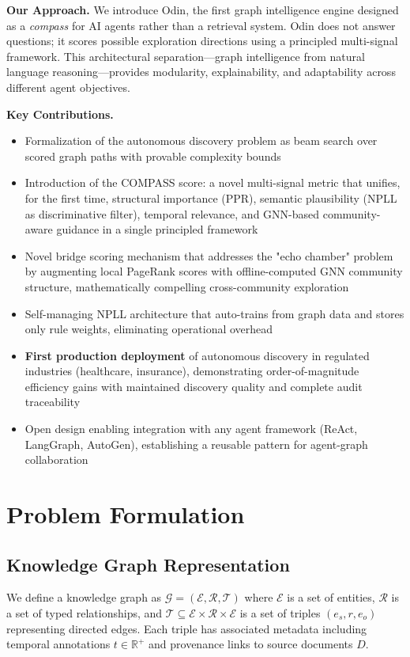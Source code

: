 \documentclass[10pt,twocolumn]{article}
\begin{document}
\textbf{Our Approach.} We introduce Odin, the first graph intelligence engine designed as a \textit{compass} for AI agents rather than a retrieval system. Odin does not answer questions; it scores possible exploration directions using a principled multi-signal framework. This architectural separation---graph intelligence from natural language reasoning---provides modularity, explainability, and adaptability across different agent objectives.

\textbf{Key Contributions.}
\begin{itemize}
\item Formalization of the autonomous discovery problem as beam search over scored graph paths with provable complexity bounds
\item Introduction of the COMPASS score: a novel multi-signal metric that unifies, for the first time, structural importance (PPR), semantic plausibility (NPLL as discriminative filter), temporal relevance, and GNN-based community-aware guidance in a single principled framework
\item Novel bridge scoring mechanism that addresses the "echo chamber" problem by augmenting local PageRank scores with offline-computed GNN community structure, mathematically compelling cross-community exploration
\item Self-managing NPLL architecture that auto-trains from graph data and stores only rule weights, eliminating operational overhead
\item \textbf{First production deployment} of autonomous discovery in regulated industries (healthcare, insurance), demonstrating order-of-magnitude efficiency gains with maintained discovery quality and complete audit traceability
\item Open design enabling integration with any agent framework (ReAct, LangGraph, AutoGen), establishing a reusable pattern for agent-graph collaboration
\end{itemize}

\section{Problem Formulation}
\label{sec:problem}

\subsection{Knowledge Graph Representation}

We define a knowledge graph as $\mathcal{G} = (\mathcal{E}, \mathcal{R}, \mathcal{T})$ where $\mathcal{E}$ is a set of entities, $\mathcal{R}$ is a set of typed relationships, and $\mathcal{T} \subseteq \mathcal{E} \times \mathcal{R} \times \mathcal{E}$ is a set of triples $(e_s, r, e_o)$ representing directed edges. Each triple has associated metadata including temporal annotations $t \in \mathbb{R}^+$ and provenance links to source documents $D$.
\end{document}
